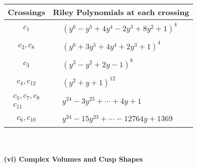 \documentclass[1p]{elsarticle_modified}
\theoremstyle{definition}
\begin{document}
\begin{tabular}{m{50pt}|m{274pt}}
Crossings & \hspace{64pt}Riley Polynomials at each crossing \\
\hline $$\begin{aligned}c_{1}\end{aligned}$$&$\begin{aligned}
&(y^6- y^5+4 y^4-2 y^3+8 y^2+1)^4
\end{aligned}$\\
\hline $$\begin{aligned}c_{2},c_{8}\end{aligned}$$&$\begin{aligned}
&(y^6+3 y^5+4 y^4+2 y^3+1)^4
\end{aligned}$\\
\hline $$\begin{aligned}c_{3}\end{aligned}$$&$\begin{aligned}
&(y^3- y^2+2 y-1)^8
\end{aligned}$\\
\hline $$\begin{aligned}c_{4},c_{12}\end{aligned}$$&$\begin{aligned}
&(y^2+y+1)^{12}
\end{aligned}$\\
\hline $$\begin{aligned}c_{5},c_{7},c_{9}\\c_{11}\end{aligned}$$&$\begin{aligned}
&y^{24}-3 y^{23}+\cdots+4 y+1
\end{aligned}$\\
\hline $$\begin{aligned}c_{6},c_{10}\end{aligned}$$&$\begin{aligned}
&y^{24}-15 y^{23}+\cdots-12764 y+1369
\end{aligned}$\\
\hline
\end{tabular}\\~\\
\newpage\flushleft \textbf{(vi) Complex Volumes and Cusp Shapes}
\end{document}
